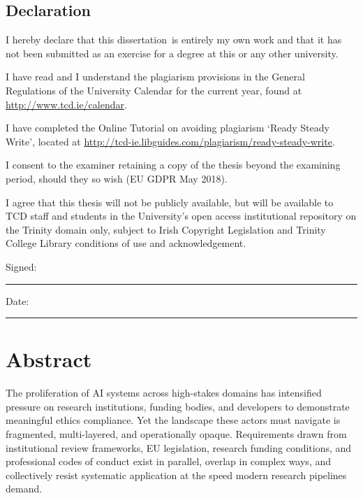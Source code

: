 \documentclass[a4paper,oneside,12pt]{book}
\title{\thesistitle}
\author{\authorname}
\newcommand{\typeofthesis}{dissertation}
\numberwithin{equation}{chapter}
\begin{document}


\section*{\Huge\textcolor{tcd_blue}{Declaration}}
\vspace{1cm}
I hereby declare that this \typeofthesis\ is entirely my own work and that it has not been submitted as an exercise for a degree at this or any other university.

\vspace{1cm}
I have read and I understand the plagiarism provisions in the General Regulations of the University Calendar for the current year, found at \url{http://www.tcd.ie/calendar}.
\vspace{1cm}

I have completed the Online Tutorial on avoiding plagiarism `Ready Steady Write', located at \url{http://tcd-ie.libguides.com/plagiarism/ready-steady-write}.
\vspace{1cm}

I consent to the examiner retaining a copy of the thesis beyond the examining period, should they so wish (EU GDPR May 2018).
\vspace{1cm}

I agree that this thesis will not be publicly available, but will be available to TCD staff and students in the University's open access institutional repository on the Trinity domain only, subject to Irish Copyright Legislation and Trinity College Library conditions of use and acknowledgement.
\vspace{3cm}

Signed:~\rule{5cm}{0.3pt}\hfill Date:~\rule{5cm}{0.3pt}

\chapter*{Abstract}

The proliferation of AI systems across high-stakes domains has intensified pressure on research institutions, funding bodies, and developers to demonstrate meaningful ethics compliance. Yet the landscape these actors must navigate is fragmented, multi-layered, and operationally opaque. Requirements drawn from institutional review frameworks, EU legislation, research funding conditions, and professional codes of conduct exist in parallel, overlap in complex ways, and collectively resist systematic application at the speed modern research pipelines demand.
\end{document}
